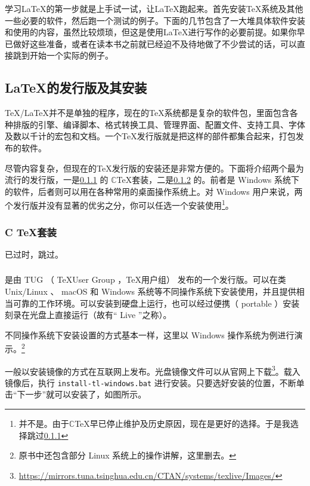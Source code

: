 学习\LaTeX 的第一步就是上手试一试，让\LaTeX 跑起来。首先安装\TeX 系统及其他一些必要的软件，然后跑一个测试的例子。下面的几节包含了一大堆具体软件安装和使用的内容，虽然比较烦琐，但这是使用\LaTeX 进行写作的必要前提。如果你早已做好这些准备，或者在读本书之前就已经迫不及待地做了不少尝试的话，可以直接跳到开始一个实际的例子。

\subsection{\LaTeX 的发行版及其安装}

\TeX/\LaTeX 并不是单独的程序，现在的\TeX 系统都是复杂的软件包，里面包含各种排版的引擎、编译脚本、格式转换工具、管理界面、配置文件、支持工具、字体及数以千计的宏包和文档。一个\TeX 发行版就是把这样的部件都集合起来，打包发布的软件。

尽管内容复杂，但现在的\TeX 发行版的安装还是非常方便的。下面将介绍两个最为流行的发行版，一是\ref{subsubsec:1} 的 $\mathbb{C}$\TeX 套装，二是\ref{subsubsec:2} 的\texlive 。前者是 Windows 系统下的软件，后者则可以用在各种常用的桌面操作系统上。对 Windows 用户来说，两个发行版并没有显著的优劣之分，你可以任选一个安装使用\footnote{并不是。由于$\mathbb{C}$\TeX 早已停止维护及历史原因，现在\texlive 是更好的选择。于是我选择跳过\ref{subsubsec:1} }。 

\subsubsection{C \TeX 套装}\label{subsubsec:1}

已过时，跳过。

\subsubsection{\texlive} \label{subsubsec:2}

\texlive 是由 TUG （ \TeX User Group ，\TeX 用户组） 发布的一个发行版。\texlive 可以在类 Unix/Linux 、 macOS 和 Windows 系统等不同操作系统下安装使用，并且提供相当可靠的工作环境。\texlive 可以安装到硬盘上运行，也可以经过便携（ portable ）安装刻录在光盘上直接运行（故有“ Live ”之称）。

不同操作系统下安装设置\texlive 的方式基本一样，这里以 Windows 操作系统为例进行演示。\footnote{原书中还包含部分 Linux 系统上的操作讲解，这里删去。}

\texlive 一般以安装镜像的方式在互联网上发布。光盘镜像文件可以从官网上下载\footnote{\href{https://mirrors.tuna.tsinghua.edu.cn/CTAN/systems/texlive/Images/}{https://mirrors.tuna.tsinghua.edu.cn/CTAN/systems/texlive/Images/}}。载入镜像后，执行 \lstinline{install-tl-windows.bat} 进行安装。只要选好安装的位置，不断单击“下一步”就可以安装\texlive 了，如图所示。

